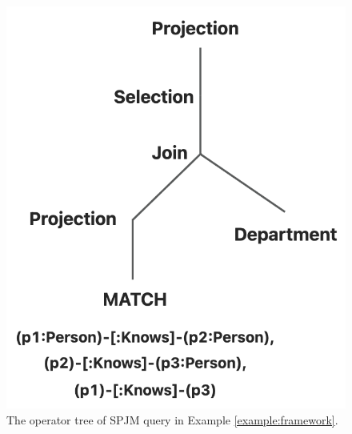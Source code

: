 \begin{figure}
    \centering
    \includegraphics[width=.6\linewidth]{./figures/example_tree.png}
    \caption{The operator tree of SPJM query in Example \ref{example:framework}.}
    \label{fig:example-operator-tree}
\end{figure}

